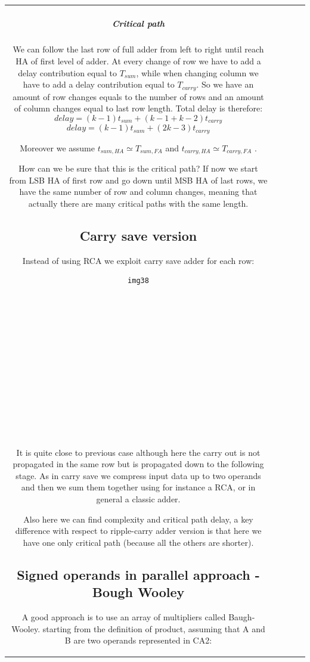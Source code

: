 \begin{center}
\begin{tabular}{|c|c|c|c|c|}
\subparagraph{Critical path}
We can follow the last row of full adder from left to right until reach HA of first level of adder. At every change of row we have to add a delay contribution equal to $T_{sum}$, while when changing column we have to add a delay contribution equal to $T_{carry}$. So we have an amount of row changes equals to the number of rows and an amount of column changes equal to last row length. Total delay is therefore:
$$delay=(k-1)t_{sum}+(k-1+k-2)t_{carry}$$
$$delay=(k-1)t_{sum}+(2k-3)t_{carry}$$

Moreover we assume $t_{sum, HA} \simeq T_{sum, FA}$ and $t_{carry, HA} \simeq T_{carry, FA}$ .

How can we be sure that this is the critical path? If now we start from LSB HA of first row and go down until MSB HA of last rows, we have the same number of row and column changes, meaning that actually there are many critical paths with the same length.

\subsection{Carry save version}
Instead of using RCA we exploit carry save adder for each row:
\begin{verbatim}
img38














\end{verbatim}

It is quite close to previous case although here the carry out is not propagated in the same row but is propagated down to the following stage. As in carry save we compress input data up to two operands and then we sum them together using for instance a RCA, or in general a classic adder.

Also here we can find complexity and critical path delay, a key difference with respect to ripple-carry adder version is that here we have one only critical path (because all the others are shorter).

\subsection{Signed operands in parallel approach - Bough Wooley}
A good approach is to use an array of multipliers called Baugh-Wooley.
starting from the definition of product, assuming that A and B are two operands represented in CA2:


\end{tabular}
\end{center}
